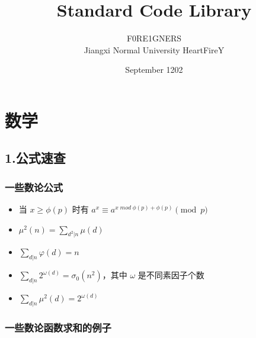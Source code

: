 \documentclass[]{article}
\date{}
\title{\vspace{50mm} \huge Standard Code Library \\[20pt]}
\author{F0RE1GNERS \\[10pt] Jiangxi Normal University HeartFireY}
\date{September 1202}
\providecommand{\tightlist}{%
  \setlength{\itemsep}{0pt}\setlength{\parskip}{0pt}}
\begin{document}
\begin{titlepage}

\maketitle

\end{titlepage}

\newpage

\renewcommand\labelitemi{$\bullet$}

{
\setcounter{tocdepth}{3}
\tableofcontents
\newpage
}








\hypertarget{ux6570ux5b66}{%
\section{数学}\label{ux6570ux5b66}}

\hypertarget{ux516cux5f0fux901fux67e5}{%
\subsection{1.公式速查}\label{ux516cux5f0fux901fux67e5}}

\hypertarget{ux4e00ux4e9bux6570ux8bbaux516cux5f0f}{%
\subsubsection{一些数论公式}\label{ux4e00ux4e9bux6570ux8bbaux516cux5f0f}}

\begin{itemize}
\tightlist
\item
  当 \(x\geq\phi(p)\) 时有
  \(a^x\equiv a^{x \; mod \; \phi(p) + \phi(p)}\pmod p\)
\item
  \(\mu^2(n)=\sum_{d^2|n} \mu(d)\)
\item
  \(\sum_{d|n} \varphi(d)=n\)
\item
  \(\sum_{d|n} 2^{\omega(d)}=\sigma_0(n^2)\)，其中 \(\omega\)
  是不同素因子个数
\item
  \(\sum_{d|n} \mu^2(d)=2^{\omega(d)}\)
\end{itemize}

\hypertarget{ux4e00ux4e9bux6570ux8bbaux51fdux6570ux6c42ux548cux7684ux4f8bux5b50}{%
\subsubsection{一些数论函数求和的例子}\label{ux4e00ux4e9bux6570ux8bbaux51fdux6570ux6c42ux548cux7684ux4f8bux5b50}}
\end{document}
